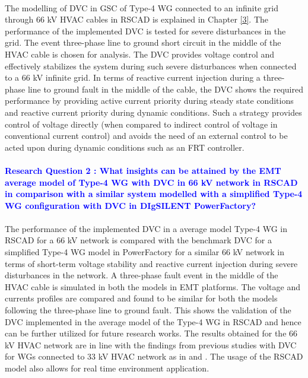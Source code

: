 \paragraph{} The modelling of \gls{DVC} in \gls{GSC} of Type-4 \gls{WG} connected to an infinite grid through 66 kV \gls{HVAC} cables in RSCAD is explained in Chapter \ref{3}. The performance of the implemented \gls{DVC} is tested for severe disturbances in the grid. The event three-phase line to ground short circuit in the middle of the \gls{HVAC} cable is chosen for analysis. The \gls{DVC} provides voltage control and effectively stabilizes the system during such severe disturbances when connected to a 66 kV infinite grid. In terms of reactive current injection during a three-phase line to ground fault in the middle of the cable, the \gls{DVC} shows the required performance by providing active current priority during steady state conditions and reactive current priority during dynamic conditions. Such a strategy provides control of voltage directly (when compared to indirect control of voltage in conventional current control) and avoids the need of an external control to be acted upon during dynamic conditions such as an FRT controller. 

\paragraph{\textcolor{blue}{Research Question 2 : What insights can be attained by the \gls{EMT} average model of Type-4 \gls{WG} with \gls{DVC} in 66 kV network in RSCAD in comparison with a similar system modelled with a simplified Type-4 \gls{WG} configuration with \gls{DVC} in DIgSILENT PowerFactory?}}

\paragraph{} The performance of the implemented \gls{DVC} in a average model Type-4 \gls{WG} in RSCAD for a 66 kV network is compared with the benchmark \gls{DVC} for a simplified Type-4 \gls{WG} model in PowerFactory for a similar 66 kV network in terms of short-term voltage stability and reactive current injection during severe disturbances in the network. A three-phase fault event in the middle of the \gls{HVAC} cable is simulated in both the models in \gls{EMT} platforms. The voltage and currents profiles are compared and found to be similar for both the models following the three-phase line to ground fault. This shows the validation of the \gls{DVC} implemented in the average model of the Type-4 \gls{WG} in RSCAD and hence can be further utilized for future research works. The results obtained for the 66 kV \gls{HVAC} network are in line with the findings from previous studies with \gls{DVC} for \gls{WG}s connected to 33 kV \gls{HVAC} network as in \cite{korai_dynamic_2019} and \cite{sethi_real-time_nodate-new}. The usage of the RSCAD model also allows for real time environment application.    

